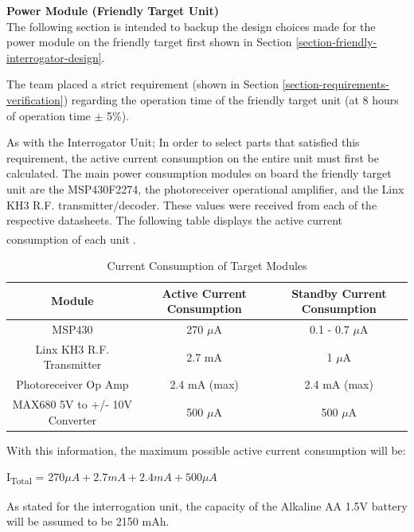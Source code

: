 \documentclass[letterpaper,10pt]{article}
\begin{document}
\begin{spacing}{1.15}
\normalsize\textbf{Power Module (Friendly Target Unit)} \\
The following section is intended to backup the design choices made for the power module on the friendly target first shown in Section \ref{section-friendly-interrogator-design}.

The team placed a strict requirement (shown in Section \ref{section-requirements-verification}) regarding the operation time of the friendly target unit (at 8 hours of operation time $\pm$ 5\%).

As with the Interrogator Unit; In order to select parts that satisfied this requirement, the active current consumption on the entire unit must first be calculated. The main power consumption modules on board the friendly target unit are the MSP430F2274, the photoreceiver operational amplifier, and the Linx KH3 R.F. transmitter/decoder. These values were received from each of the respective datasheets. The following table displays the active current consumption of each unit\textsuperscript{\cite{MSP430F2274} \cite{Linx-Receiver} \cite{Laser}}. 


\begin{table}[htbp]
	\centering
	\begin{tabular}{c|c|c}	%
		\toprule	%
		Module & Active Current Consumption & Standby Current Consumption\\
		\midrule
		MSP430 & 270 $\mu$A & 0.1 - 0.7 $\mu$A\\ 
		Linx KH3 R.F. Transmitter & 2.7 mA & 1 $\mu$A\\
		Photoreceiver Op Amp & 2.4 mA (max) & 2.4 mA (max) \\
		MAX680 5V to +/- 10V Converter & 500 $\mu$A  & 500 $\mu$A \\
		\bottomrule	%
	\end{tabular}%
	\caption{Current Consumption of Target Modules}
	\label{tab:table2}	%
\end{table}%

With this information, the maximum possible active current consumption will be:
\begin{center}{I\textsubscript{Total} = $270 \mu A + 2.7 mA + 2.4 mA + 500 \mu A$}\end{center}

As stated for the interrogation unit, the capacity of the Alkaline AA 1.5V battery will be assumed to be 2150 mAh. 


\end{spacing}
\end{document}
